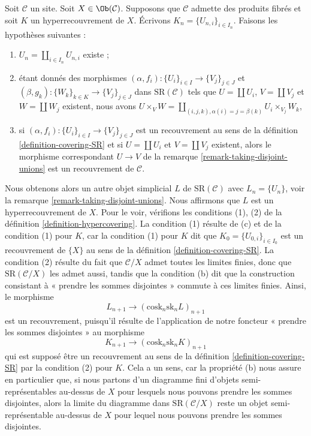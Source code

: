 \begin{remark}
\label{remark-take-unions-hypercovering-X}
Soit $\mathcal{C}$ un site. Soit $X \in \Ob(\mathcal{C})$.
Supposons que $\mathcal{C}$ admette des produits fibrés et soit $K$ un hyperrecouvrement de $X$.
Écrivons $K_n = \{U_{n, i}\}_{i \in I_n}$. Faisons les hypothèses suivantes :
\begin{enumerate}
\item[(a)] $U_n = \coprod_{i \in I_n} U_{n, i}$ existe ;
\item[(b)] étant donnés des morphismes
$(\alpha, f_i) : \{U_i\}_{i \in I} \to \{V_j\}_{j \in J}$ et
$(\beta, g_k) : \{W_k\}_{k \in K} \to \{V_j\}_{j \in J}$
dans $\text{SR}(\mathcal{C})$ tels que
$U = \coprod U_i$, $V = \coprod V_j$ et $W = \coprod W_j$
existent, nous avons $U \times_V W =
\coprod_{(i, j, k), \alpha(i) = j = \beta(k)} U_i \times_{V_j} W_k$,
\item[(c)] si $(\alpha, f_i) : \{U_i\}_{i \in I} \to \{V_j\}_{j \in J}$
est un recouvrement au sens de la
définition \ref{definition-covering-SR}
et si $U = \coprod U_i$ et $V = \coprod V_j$ existent,
alors le morphisme correspondant $U \to V$
de la remarque \ref{remark-taking-disjoint-unions}
est un recouvrement de $\mathcal{C}$.
\end{enumerate}
Nous obtenons alors un autre objet simplicial $L$ de $\text{SR}(\mathcal{C})$
avec $L_n = \{U_n\}$, voir la
remarque \ref{remark-taking-disjoint-unions}.
Nous affirmons que $L$ est un hyperrecouvrement de $X$.
Pour le voir, vérifions les conditions (1), (2) de la
définition \ref{definition-hypercovering}.
La condition (1) résulte de (c) et de la condition (1) pour $K$,
car la condition (1) pour $K$ dit que $K_0 = \{U_{0, i}\}_{i \in I_0}$
est un recouvrement de $\{X\}$ au sens de la
définition \ref{definition-covering-SR}.
La condition (2) résulte du fait que $\mathcal{C}/X$ admet
toutes les limites finies, donc que $\text{SR}(\mathcal{C}/X)$
les admet aussi, tandis que la condition (b) dit que la
construction consistant à « prendre les sommes disjointes » commute
à ces limites finies. Ainsi, le morphisme
$$
L_{n + 1} \longrightarrow (\text{cosk}_n \text{sk}_n L)_{n + 1}
$$
est un recouvrement, puisqu'il résulte de l'application de notre foncteur
« prendre les sommes disjointes » au morphisme
$$
K_{n + 1} \longrightarrow (\text{cosk}_n \text{sk}_n K)_{n + 1}
$$
qui est supposé être un recouvrement au sens de la
définition \ref{definition-covering-SR} par la condition (2) pour $K$.
Cela a un sens, car la propriété (b) nous assure en particulier
que, si nous partons d'un diagramme fini d'objets
semi-représentables au-dessus de $X$
pour lesquels nous pouvons prendre les sommes disjointes, alors
la limite du diagramme dans $\text{SR}(\mathcal{C}/X)$
reste un objet semi-représentable au-dessus de $X$ pour lequel
nous pouvons prendre les sommes disjointes.
\end{remark}











